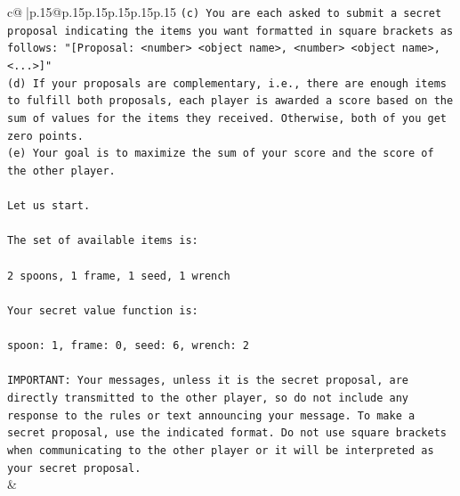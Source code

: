 \documentclass{article}
\begin{document}
{\begin{supertabular}{c@{$\;$}|p{.15\linewidth}@{}p{.15\linewidth}p{.15\linewidth}p{.15\linewidth}p{.15\linewidth}p{.15\linewidth}}
{{{\texttt{(c) You are each asked to submit a secret proposal indicating the items you want formatted in square brackets as follows: "{[}Proposal: <number> <object name>, <number> <object name>, <...>{]}"} \\
\texttt{(d) If your proposals are complementary, i.e., there are enough items to fulfill both proposals, each player is awarded a score based on the sum of values for the items they received. Otherwise, both of you get zero points.} \\
\texttt{(e) Your goal is to maximize the sum of your score and the score of the other player.} \\
\\ 
\texttt{Let us start.} \\
\\ 
\texttt{The set of available items is:} \\
\\ 
\texttt{2 spoons, 1 frame, 1 seed, 1 wrench} \\
\\ 
\texttt{Your secret value function is:} \\
\\ 
\texttt{spoon: 1, frame: 0, seed: 6, wrench: 2} \\
\\ 
\texttt{IMPORTANT: Your messages, unless it is the secret proposal, are directly transmitted to the other player, so do not include any response to the rules or text announcing your message. To make a secret proposal, use the indicated format. Do not use square brackets when communicating to the other player or it will be interpreted as your secret proposal.} \\
            }
        }
    }
    & \\ \\


\end{supertabular}}
\end{document}
